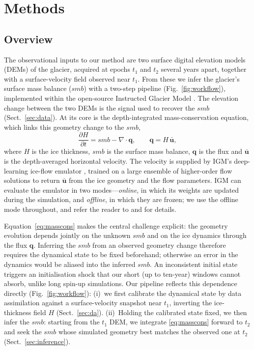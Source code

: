 \section{Methods}\label{sec:methods}

\subsection{Overview}\label{sec:overview}

The observational inputs to our method are two surface digital elevation models
(DEMs) of the glacier, acquired at epochs $t_1$ and $t_2$ several years apart,
together with a surface-velocity field observed near $t_1$. From these we infer the
glacier's surface mass balance ($smb$) with a two-step pipeline
(Fig.~\ref{fig:workflow}), implemented within the open-source Instructed Glacier
Model \citep[IGM;][]{jouvet2026igm}.
The elevation change between
the two DEMs is the signal used to recover the $smb$ (Sect.~\ref{sec:data}).
At its core is the depth-integrated mass-conservation equation, which links this
geometry change to the $smb$,
\begin{equation}
  \frac{\partial H}{\partial t} = smb - \nabla\cdot\mathbf{q},
  \qquad
  \mathbf{q} = H\,\bar{\mathbf{u}},
  \label{eq:masscons}
\end{equation}
where $H$ is the ice thickness, $smb$ is the surface mass balance, $\mathbf{q}$ is the flux and
$\bar{\mathbf{u}}$ is the depth-averaged horizontal velocity.
The velocity is supplied by IGM's deep-learning ice-flow
emulator \citep{jouvet_cordonnier2023, rosier2026}, trained on a large ensemble of
higher-order flow solutions to return $\bar{\mathbf{u}}$ from the ice geometry and
the flow parameters.
IGM can evaluate the emulator in two modes---\emph{online}, in which its weights are
updated during the simulation, and \emph{offline}, in which they are frozen; we use
the offline mode throughout, and refer the reader to
\citet{jouvet2026igm} and \citet{rosier2026} for details.

Equation~\eqref{eq:masscons} makes the central challenge explicit: the geometry
evolution depends jointly on the unknown $smb$ and on the ice dynamics through the
flux $\mathbf{q}$. Inferring the $smb$ from an observed geometry change therefore
requires the dynamical state to be fixed beforehand; otherwise an error in the
dynamics would be aliased into the inferred $smb$. An inconsistent initial state
triggers an initialisation shock \citep{seroussi2011} that our short (up to
ten-year) windows cannot absorb, unlike long spin-up simulations. Our pipeline
reflects this dependence directly (Fig.~\ref{fig:workflow}): (i)~we first calibrate
the dynamical state by data assimilation against a surface-velocity snapshot near
$t_1$, inverting the ice-thickness field $H$
(Sect.~\ref{sec:da}). (ii)~Holding the calibrated state fixed, we then infer the
$smb$: starting from the $t_1$ DEM, we integrate
\eqref{eq:masscons} forward to $t_2$ and seek the $smb$ whose simulated
geometry best matches the observed one at $t_2$
(Sect.~\ref{sec:inference}).

